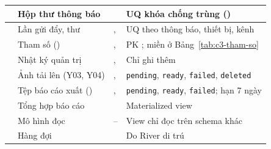 {\begin{longtable}{|L{3.9cm}|L{2.8cm}|L{3.3cm}|L{\dimexpr{}\arrayrulewidth-3.9cm-2.8cm-3.3cm\relax}|}
 & Hộp thư thông báo &  & UQ khóa chống trùng ()\\ \hline
{} & Lần gửi đẩy, thư & ,  & UQ theo thông báo, thiết bị, kênh\\ \hline
{} & Tham số () & ,  & PK ; miền ở Bảng~\ref{tab:c3-tham-so}\\ \hline
{} & Nhật ký quản trị & ,  & Chỉ ghi thêm\\ \hline
{} & Ảnh tải lên (Y03, Y04) & ,  & \texttt{pending}, \texttt{ready}, \texttt{failed}, \texttt{deleted}\\ \hline
{} & Tệp báo cáo xuất () & ,  & \texttt{pending}, \texttt{ready}, \texttt{failed}; hạn 7 ngày\\ \hline
{} & Tổng hợp báo cáo &  & Materialized view\\ \hline
{} & Mô hình đọc & -- & View chỉ đọc trên schema khác\\ \hline
{} & Hàng đợi~\cite{river} &  & Do River di trú\\ \hline
\end{longtable}
}
